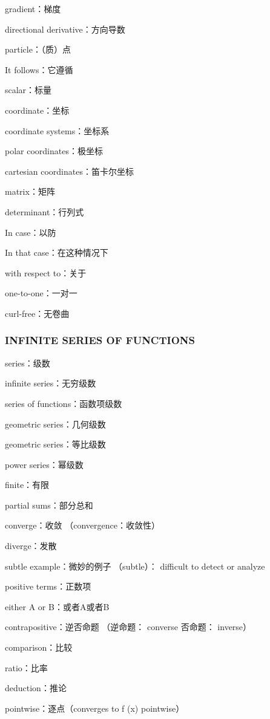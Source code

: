 \documentclass[hazy,blue,11pt]{elegantnote}
\begin{document}
    gradient：梯度

    directional derivative：方向导数

    particle：（质）点

    It follows：它遵循

    scalar：标量

    coordinate：坐标

    coordinate systems：坐标系

    polar coordinates：极坐标

    cartesian coordinates：笛卡尔坐标

    matrix：矩阵

    determinant：行列式

    In case：以防

    In that case：在这种情况下

    with respect to：关于

    one-to-one：一对一

    curl-free：无卷曲

\subsubsection{INFINITE SERIES OF FUNCTIONS}

    series：级数

    infinite series：无穷级数

    series of functions：函数项级数

    geometric series：几何级数

    geometric series：等比级数

    power series：幂级数

    finite：有限

    partial sums：部分总和

    converge：收敛
    （convergence：收敛性）

    diverge：发散

    subtle example：微妙的例子
    （subtle）： difficult to detect or analyze

    positive terms：正数项

    either A or B：或者A或者B

    contrapositive：逆否命题
    （逆命题： converse 否命题： inverse）

    comparison：比较

    ratio：比率

    deduction：推论

    pointwise：逐点（converges to f (x) pointwise）
\end{document}
